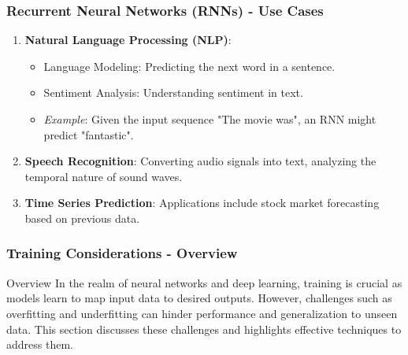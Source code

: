 \documentclass[aspectratio=169]{beamer}
\begin{document}
\begin{frame}[fragile]
    \frametitle{Recurrent Neural Networks (RNNs) - Use Cases}
    \begin{enumerate}
        \item \textbf{Natural Language Processing (NLP)}:
        \begin{itemize}
            \item Language Modeling: Predicting the next word in a sentence.
            \item Sentiment Analysis: Understanding sentiment in text.
            \item \textit{Example}: Given the input sequence "The movie was", an RNN might predict "fantastic".
        \end{itemize}
        
        \item \textbf{Speech Recognition}: Converting audio signals into text, analyzing the temporal nature of sound waves.
        
        \item \textbf{Time Series Prediction}: Applications include stock market forecasting based on previous data.
    \end{enumerate}
\end{frame}

\begin{frame}[fragile]
  \frametitle{Training Considerations - Overview}
  \begin{block}{Overview}
    In the realm of neural networks and deep learning, training is crucial as models learn to map input data to desired outputs. However, challenges such as overfitting and underfitting can hinder performance and generalization to unseen data. This section discusses these challenges and highlights effective techniques to address them.
  \end{block}
\end{frame}
\end{document}
